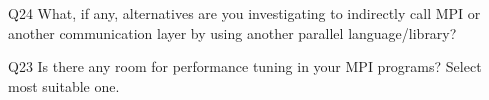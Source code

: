 \begin{description}%
\item{Q24} What, if any, alternatives are you investigating to indirectly call MPI or another communication layer by using another parallel language/library?%
\item{Q23} Is there any room for performance tuning in your MPI programs? Select most suitable one.%
\end{description}%
